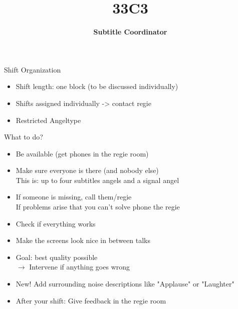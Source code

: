 \documentclass[utf8,widescreen]{beamer}
\title{\Huge \textbf{33C3}}
\subtitle{{\Large \textbf{Subtitle Coordinator}}\\}
\date{}
\begin{document}
\begin{frame}{\titlepage}
\end{frame}

\begin{frame}{Shift Organization}
\pause
\begin{block}{}
\begin{itemize}\itemsep 14pt
\item{Shift length: one block (to be discussed individually)}
\pause
\item{Shifts assigned individually -> contact regie}
\pause
\item{Restricted Angeltype}
\end{itemize}
\end{block}
\end{frame}

\begin{frame}{What to do?}
\pause
\begin{block}{}
\begin{itemize}\itemsep 12pt
\item{Be available (get phones in the regie room)}
\pause
\item{Make sure everyone is there (and nobody else)\\
This is: up to four subtitles angels and a signal angel}
\pause
\item{If someone is missing, call them/regie\\
If problems arise that you can't solve phone the regie}
\pause
\item{Check if everything works}
\pause
\item{Make the screens look nice in between talks}
\pause
\item{Goal: best quality possible\\
\pause
$\rightarrow$ Intervene if anything goes wrong}
\pause
\item{{\color{red}New!} Add surrounding noise descriptions like "Applause" or "Laughter"}
\pause
\item{After your shift: Give feedback in the regie room}
\end{itemize}
\end{block}
\end{frame}
\end{document}
